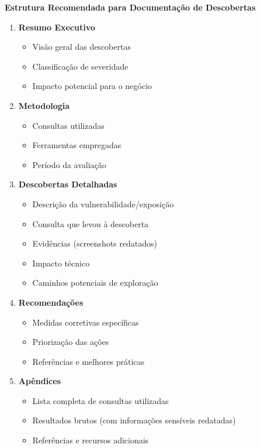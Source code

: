 \documentclass[12pt,a4paper]{book}
\begin{document}
\begin{mdframed}[backgroundcolor=azulseguranca!5, roundcorner=10pt, leftmargin=1cm, rightmargin=1cm]
\begin{center}
\textbf{\large Estrutura Recomendada para Documentação de Descobertas}
\end{center}

\begin{enumerate}
    \item \textbf{Resumo Executivo}
    \begin{itemize}
        \item Visão geral das descobertas
        \item Classificação de severidade
        \item Impacto potencial para o negócio
    \end{itemize}
    
    \item \textbf{Metodologia}
    \begin{itemize}
        \item Consultas utilizadas
        \item Ferramentas empregadas
        \item Período da avaliação
    \end{itemize}
    
    \item \textbf{Descobertas Detalhadas}
    \begin{itemize}
        \item Descrição da vulnerabilidade/exposição
        \item Consulta que levou à descoberta
        \item Evidências (screenshots redatados)
        \item Impacto técnico
        \item Caminhos potenciais de exploração
    \end{itemize}
    
    \item \textbf{Recomendações}
    \begin{itemize}
        \item Medidas corretivas específicas
        \item Priorização das ações
        \item Referências e melhores práticas
    \end{itemize}
    
    \item \textbf{Apêndices}
    \begin{itemize}
        \item Lista completa de consultas utilizadas
        \item Resultados brutos (com informações sensíveis redatadas)
        \item Referências e recursos adicionais
    \end{itemize}
\end{enumerate}
\end{mdframed}
\end{document}
